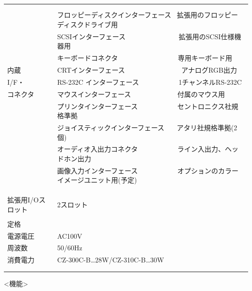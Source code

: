 \documentclass[twoside,a4paper,12pt]{article}
\begin{document}
\begin{tabular}{|p{17mm}|p{13mm}|p{23mm}|p{80mm}|p{30mm}|}
& \multicolumn{4}{l|}{}\\
\cline{2-5}
& \multicolumn{4}{l|}{}\\[-3mm]
& \multicolumn{4}{l|}{フロッピーディスクインターフェース \ 拡張用のフロッピーディスクドライブ用}\\[2mm]
& \multicolumn{4}{l|}{SCSIインターフェース \ \ \ \ \ \ \ \ \ \ \ \ \ \ \ 拡張用のSCSI仕様機器用}\\[2mm]
& \multicolumn{4}{l|}{キーボードコネクタ \ \ \ \ \ \ \ \ \ \ \ \ \ \ \ \ \ 専用キーボード用}\\
内蔵 & \multicolumn{4}{l|}{CRTインターフェース \ \ \ \ \ \ \ \ \ \ \ \ \ \ \ \ アナログRGB出力}\\
I/F・ & \multicolumn{4}{l|}{RS-232C インターフェース \ \ \ \ \ \ \ \ \ \ \ 1チャンネルRS-232C}\\
コネクタ & \multicolumn{4}{l|}{マウスインターフェース \ \ \ \ \ \ \ \ \ \ \ \ \ 付属のマウス用}\\
& \multicolumn{4}{l|}{プリンタインターフェース \ \ \ \ \ \ \ \ \ \ \ セントロニクス社規格準拠}\\
& \multicolumn{4}{l|}{ジョイスティックインターフェース \ \ \ アタリ社規格準拠(2個)}\\
& \multicolumn{4}{l|}{オーディオ入出力コネクタ \ \ \ \ \ \ \ \ \ \ \ ライン入出力、ヘッドホン出力}\\
& \multicolumn{4}{l|}{画像入力インターフェース \ \ \ \ \ \ \ \ \ \ \ オプションのカラーイメージユニット用(予定)}\\
& \multicolumn{4}{l|}{}\\
& \multicolumn{4}{l|}{}\\
\hline
\multicolumn{3}{|l|}{} & \multicolumn{2}{l|}{}\\[-3mm]
\multicolumn{3}{|l|}{拡張用I/Oスロット} & \multicolumn{2}{l|}{2スロット}\\
\hline
& \multicolumn{4}{l|}{}\\[-3mm]
定格 & \multicolumn{4}{l|}{}\\
電源電圧 & \multicolumn{4}{l|}{AC100V}\\
周波数 & \multicolumn{4}{l|}{50/60Hz}\\
消費電力 & \multicolumn{4}{l|}{CZ-300C-B…28W/CZ-310C-B…30W}\\
& \multicolumn{4}{l|}{}\\
& \multicolumn{4}{l|}{}\\
\hline
\end{tabular}

\newpage

<機能>
\end{document}
